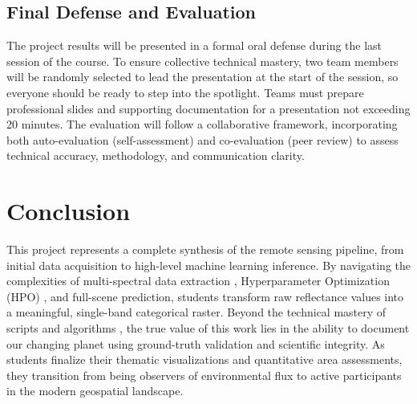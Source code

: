 \documentclass{article}
\begin{document}
\subsection*{Final Defense and Evaluation}
The project results will be presented in a formal oral defense during the last session of the course. To ensure collective technical mastery, two team members will be randomly selected to lead the presentation at the start of the session, so everyone should be ready to step into the spotlight. Teams must prepare professional slides and supporting documentation for a presentation not exceeding 20 minutes. The evaluation will follow a collaborative framework, incorporating both auto-evaluation (self-assessment) and co-evaluation (peer review) to assess technical accuracy, methodology, and communication clarity.

\section{Conclusion}
This project represents a complete synthesis of the remote sensing pipeline, from initial data acquisition to high-level machine learning inference. By navigating the complexities of multi-spectral data extraction , Hyperparameter Optimization (HPO) , and full-scene prediction, students transform raw reflectance values into a meaningful, single-band categorical raster.  Beyond the technical mastery of scripts and algorithms , the true value of this work lies in the ability to document our changing planet using ground-truth validation and scientific integrity. As students finalize their thematic visualizations and quantitative area assessments, they transition from being observers of environmental flux to active participants in the modern geospatial landscape.
\end{document}
